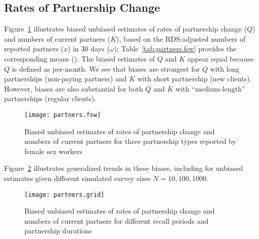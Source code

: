 \subsection{Rates of Partnership Change}\label{res.partners}
Figure~\ref{fig:partners.fsw} illustrates biased \vs unbiased estimates of
rates of partnership change ($Q$) and numbers of current partners ($K$),
based on the RDS-adjusted numbers of reported partners ($x$) in 30 days ($\omega$);
Table~\ref{tab:partners.fsw} provides the corresponding means (\ci).
The biased estimates of $Q$ and $K$ appear equal because $Q$ is defined as per-month.
We see that biases are strongest for
$Q$ with long partnerships (\eg non-paying partners) and
$K$ with short partnership (\eg new clients).
However, biases are also substantial for
both $Q$ and $K$ with ``medium-length'' partnerships (\eg regular clients).
\begin{figure}
  \centering\texttt{[image: partners.fsw]}
  \caption{Biased \vs unbiased estimates of
    rates of partnership change and numbers of current partners
    for three partnership types reported by female sex workers}
  \label{fig:partners.fsw}
\end{figure}
\par
Figure~\ref{fig:partners.grid} illustrates generalized trends in these biases,
including \ci for unbiased estimates given different simulated survey sizes $N = 10, 100, 1000$.
\begin{figure}
  \centering\texttt{[image: partners.grid]}
  \caption{Biased \vs unbiased estimates of
    rates of partnership change and numbers of current partners
    for different recall periods and partnership durations}
  \label{fig:partners.grid}
\end{figure}
